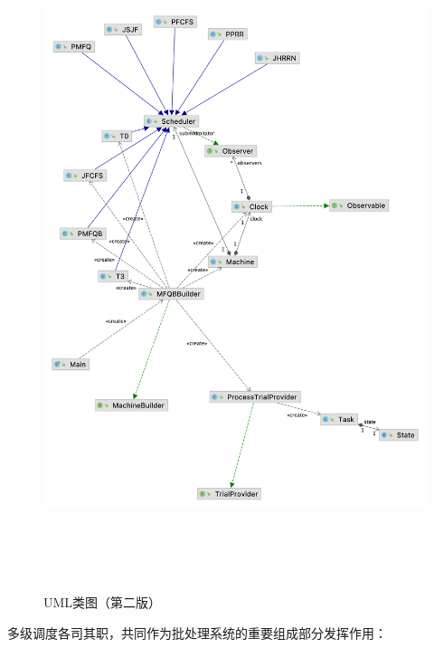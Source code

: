 \documentclass[12pt, a4paper, UTF8]{ctexart}
\begin{document}
\begin{figure}[htbp]
    \centering
    \includegraphics[height=550pt]{v1-class-compat.png}
    \caption{UML类图（第二版）}
\end{figure}

多级调度各司其职，共同作为批处理系统的重要组成部分发挥作用：
\end{document}
